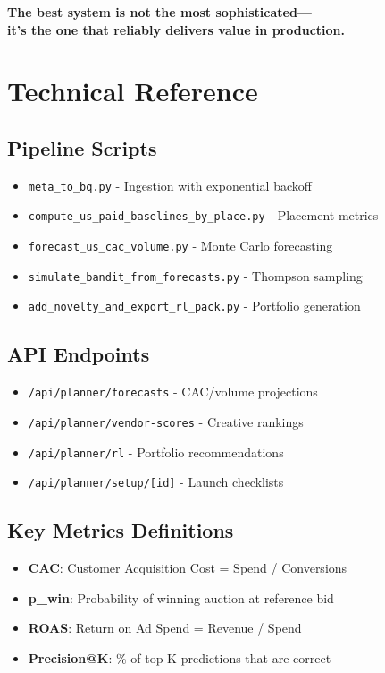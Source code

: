 \documentclass[11pt,a4paper]{report}
\begin{document}
\vspace{1cm}

\begin{center}
{\Large\bfseries\color{aelpdark}
The best system is not the most sophisticated—\\
it's the one that reliably delivers value in production.}
\end{center}

\appendix

\chapter{Technical Reference}

\section{Pipeline Scripts}
\begin{itemize}
    \item \texttt{meta\_to\_bq.py} - Ingestion with exponential backoff
    \item \texttt{compute\_us\_paid\_baselines\_by\_place.py} - Placement metrics
    \item \texttt{forecast\_us\_cac\_volume.py} - Monte Carlo forecasting
    \item \texttt{simulate\_bandit\_from\_forecasts.py} - Thompson sampling
    \item \texttt{add\_novelty\_and\_export\_rl\_pack.py} - Portfolio generation
\end{itemize}

\section{API Endpoints}
\begin{itemize}
    \item \texttt{/api/planner/forecasts} - CAC/volume projections
    \item \texttt{/api/planner/vendor-scores} - Creative rankings
    \item \texttt{/api/planner/rl} - Portfolio recommendations
    \item \texttt{/api/planner/setup/[id]} - Launch checklists
\end{itemize}

\section{Key Metrics Definitions}
\begin{itemize}
    \item \textbf{CAC}: Customer Acquisition Cost = Spend / Conversions
    \item \textbf{p\_win}: Probability of winning auction at reference bid
    \item \textbf{ROAS}: Return on Ad Spend = Revenue / Spend
    \item \textbf{Precision@K}: \% of top K predictions that are correct
\end{itemize}
\end{document}
